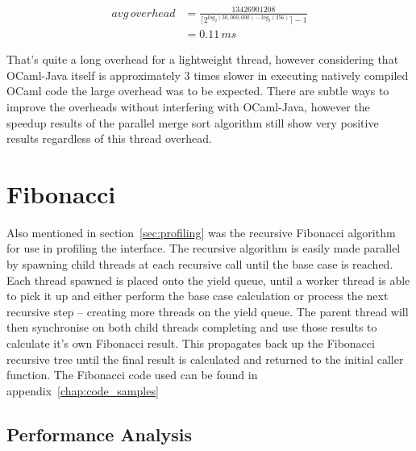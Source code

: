 \documentclass[12pt,twoside,notitlepage]{report}
\begin{document}
\begin{align*}
avg\,overhead &= \frac{13426901208}{\lceil2^{log_{2}(30,000,000) - log_{2}(256)}\rceil - 1} \\
                    &= 0.11\,ms
\end{align*}

That's quite a long overhead for a lightweight thread, however considering that OCaml-Java itself is approximately 3 times slower in executing natively compiled OCaml code\cite{web:clerc2013} the large overhead was to be expected.
There are subtle ways to improve the overheads without interfering with OCaml-Java, however the speedup results of the parallel merge sort algorithm still show very positive results regardless of this thread overhead.

\section{Fibonacci}
\label{sec:fibonacci}
%
%
Also mentioned in section~\ref{sec:profiling} was the recursive Fibonacci algorithm for use in profiling the interface. The recursive algorithm is easily made parallel by spawning child threads at each recursive call until the base
case is reached. Each thread spawned is placed onto the yield queue, until a worker thread is able to pick it up and either perform the base case calculation or process the next recursive step -- creating more threads on the yield
queue. The parent thread will then synchronise on both child threads completing and use those results to calculate it's own Fibonacci result. This propagates back up the Fibonacci recursive tree until the final result is calculated
and returned to the initial caller function. The Fibonacci code used can be found in appendix~\ref{chap:code_samples} 

\subsection{Performance Analysis}
%
%
\end{document}
